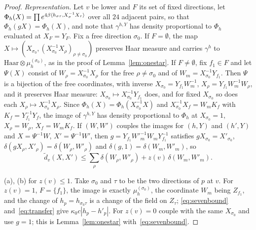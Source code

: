 \begin{proof}
\emph{Representation.} Let $v$ be lower and $F$ its set of fixed directions,
let $\Phi_h(X)=\prod e^{4\beta\langle h_{\sigma\tau},X_\sigma^{-1}X_\tau\rangle}$ over all
$24$ adjacent pairs, so that $\Phi_h(gX)=\Phi_h(X)$, and note that
$\gamma^{h,Y}$ has density proportional to $\Phi_h$ evaluated at $X_F=Y_F$. Fix
a free direction $\sigma_0$. If $F=\emptyset$, the map
$X\mapsto(X_{\sigma_0},(X_{\sigma_0}^{-1}X_\rho)_{\rho\ne\sigma_0})$ preserves
Haar measure and carries $\gamma^h$ to $\mathrm{Haar}\otimes\mu^{(\sigma_0)}_h$,
as in the proof of Lemma~\ref{lem:onestar}. If $F\ne\emptyset$, fix $f_1\in F$
and let $\Psi(X)$ consist of $W_\rho=X_{\sigma_0}^{-1}X_\rho$ for the free
$\rho\ne\sigma_0$ and of $W_m=X_{\sigma_0}^{-1}Y_{f_1}$. Then $\Psi$ is a
bijection of the free coordinates, with inverse $X_{\sigma_0}=Y_{f_1}W_m^{-1}$,
$X_\rho=Y_{f_1}W_m^{-1}W_\rho$, and it preserves Haar measure: $X_{\sigma_0}
\mapsto X_{\sigma_0}^{-1}Y_{f_1}$ does, and for fixed $X_{\sigma_0}$ so does
each $X_\rho\mapsto X_{\sigma_0}^{-1}X_\rho$. Since $\Phi_h(X)=\Phi_h(
X_{\sigma_0}^{-1}X)$ and $X_{\sigma_0}^{-1}X_f=W_mK_f$ with $K_f=Y_{f_1}^{-1}
Y_f$, the image of $\gamma^{h,Y}$ has density proportional to $\Phi_h$ at
$X_{\sigma_0}=1$, $X_\rho=W_\rho$, $X_f=W_mK_f$. If $(W,W')$ couples the images
for $(h,Y)$ and $(h',Y)$ and $X=\Psi^{-1}W$, $X'=\Psi^{-1}W'$, then
$g=Y_{f_1}W'^{-1}_mW_mY_{f_1}^{-1}$ satisfies $gX_{\sigma_0}=X'_{\sigma_0}$,
$\delta(gX_\rho,X'_\rho)=\delta(W_\rho,W'_\rho)$ and $\delta(g,1)=
\delta(W_m,W'_m)$, so
\begin{equation}\label{eq:transfer}
\tilde d_v(X,X')\le\sum_\rho\delta(W_\rho,W'_\rho)+z(v)\,\delta(W_m,W'_m).
\end{equation}

(a), (b) for $z(v)\le1$. Take $\sigma_0$ and $\tau$ to be the two directions of
$p$ at $v$. For $z(v)=1$, $F=\{f_1\}$, the image is exactly
$\mu^{(\sigma_0)}_h$, the coordinate $W_m$ being $Z_{f_1}$, and the change of
$h_p=h_{\sigma_0\tau}$ is a change of the field on $Z_\tau$;
\eqref{eq:sevenbound} and~\eqref{eq:transfer} give $\kappa_0c|h_p-h'_p|$. For
$z(v)=0$ couple with the same $X_{\sigma_0}$ and use $g=1$; this is
Lemma~\ref{lem:onestar} with~\eqref{eq:sevenbound}.


\end{proof}
